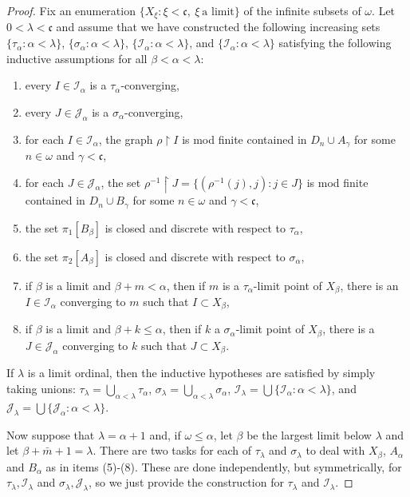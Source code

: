 \documentclass{amsart}
\theoremstyle{definition}
\theoremstyle{remark}
\begin{document}
\begin{proof}
Fix an enumeration $\{ X_\xi : \xi < \mathfrak c,\ \xi\ \mbox{a limit} \}$ of the
infinite subsets of $\omega$. Let $0<\lambda < \mathfrak c$ and
assume that we have constructed the following increasing sets
$\{ \tau_\alpha : \alpha <\lambda\}$, 
 $\{ \sigma_\alpha : \alpha < \lambda \}$,
 $\{\mathcal I_\alpha : \alpha < \lambda\}$,
 and 
  $\{\mathcal I_\alpha : \alpha < \lambda\}$ 
satisfying the following
 inductive assumptions for all $\beta < \alpha <\lambda$:
 \begin{enumerate}
 \item every $I\in \mathcal I_\alpha$ is a $\tau_\alpha$-converging,
 \item every $J\in \mathcal J_\alpha$ is a $\sigma_\alpha$-converging,
 \item for each $I\in \mathcal I_\alpha$, the graph
 $\rho\restriction I$  is mod finite contained in $D_n\cup A_\gamma$
 for some $n\in\omega$ and $\gamma <\mathfrak c$,
 \item for each $J\in \mathcal J_\alpha$, the set
  $\rho^{-1}\restriction J = \{ (\rho^{-1}(j),j) : j\in J\}$ is
  mod finite contained in $D_n\cup B_\gamma$ for some
  $n\in\omega$ and $\gamma < \mathfrak c$,
  \item the set $\pi_1[B_\beta]  $
    is closed and discrete with respect to $\tau_\alpha$,
    \item the set $\pi_2[A_\beta]$ 
    is closed and discrete with respect to $\sigma_\alpha$,
\item if $\beta$ is  a limit 
and $\beta+m  < \alpha$,
 then if $m$ is a  $\tau_\alpha$-limit point of $X_\beta$, 
           there is an $I\in \mathcal I_\alpha$ converging to $m$
           such that              $I\subset X_\beta$,
\item if $\beta$ is a limit and $\beta+k\leq \alpha$,
 then if  $k$ a $ {\sigma_\alpha}$-limit point of $ X_\beta$,
           there is a $J\in \mathcal J_\alpha$ converging to $k$
           such that              $J\subset X_\beta$.
 \end{enumerate}

 If $\lambda$ is a limit ordinal, then the inductive hypotheses
 are satisfied by simply taking unions: 
 $\tau_\lambda = \bigcup_{\alpha<\lambda}\tau_\alpha$,
  $\sigma_\lambda = \bigcup_{\alpha<\lambda}\sigma_\alpha$,
  $\mathcal I_\lambda = \bigcup \{ \mathcal I_\alpha: \alpha < \lambda\}$,
and   $\mathcal J_\lambda = \bigcup \{ \mathcal J_\alpha : \alpha<\lambda\}$.

Now suppose that $\lambda = \alpha{+}1$ and, if $\omega\leq \alpha$,
let $\beta$ be the largest limit below $\lambda$ and let
 $\beta + \bar m +1 = \lambda$.  
 There are two tasks for each 
of $\tau_{\lambda}$ and $\sigma_{\lambda}$ to deal with $X_\beta$,
 $A_\alpha$ and $B_\alpha$ as in items (5)-(8).  
 These are done independently, but symmetrically, for 
  $\tau_\lambda, \mathcal I_\lambda$ and $\sigma_\lambda,\mathcal J_\lambda$,
  so we just provide the construction for $\tau_\lambda$ and $\mathcal I_\lambda$.
 

\end{proof}
\end{document}
